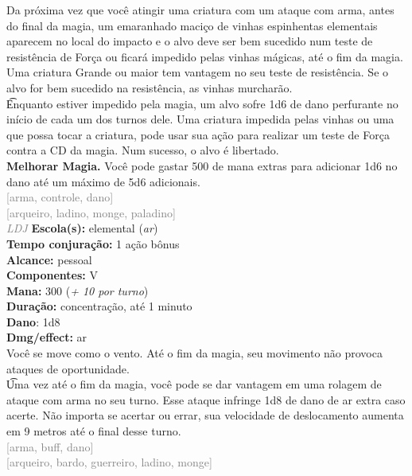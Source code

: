 \documentclass{RPG_Adventure}[2021/10/20]
\begin{document}
{\normalsize Da próxima vez que você atingir uma criatura com um ataque com arma, antes do final da magia, um emaranhado maciço de vinhas espinhentas elementais aparecem no local do impacto e o alvo deve ser bem sucedido num teste de resistência de Força ou ficará impedido pelas vinhas mágicas, até o fim da magia. Uma criatura Grande ou maior tem vantagem no seu teste de resistência. Se o alvo for bem sucedido na resistência, as vinhas murcharão.\\\t Enquanto estiver impedido pela magia, um alvo sofre 1d6 de dano perfurante no início de cada um dos turnos dele. Uma criatura impedida pelas vinhas ou uma que possa tocar a criatura, pode usar sua ação para realizar um teste de Força contra a CD da magia. Num sucesso, o alvo é libertado.\\\t \textbf{Melhorar Magia.} Você pode gastar 500 de mana extras para adicionar 1d6 no dano até um máximo de 5d6 adicionais.\\}
{\scriptsize \textcolor{gray}{[arma, controle, dano]\\}}
{\scriptsize \textcolor{gray}{[arqueiro, ladino, monge, paladino]\\}}
{\tiny \textcolor{gray}{\textit{LDJ}}}
{\small \t \textbf{Escola(s):} elemental (\textit{ar})\\\t \textbf{Tempo conjuração:} 1 ação bônus\\\t \textbf{Alcance:} pessoal\\\t \textbf{Componentes:} V\\\t \textbf{Mana:} 300 (\textit{+ 10 por turno})\\\t \textbf{Duração:} concentração, até 1 minuto\\\t \textbf{Dano}: 1d8\\\t \textbf{Dmg/effect:} ar\\}
{\normalsize Você se move como o vento. Até o fim da magia, seu movimento não provoca ataques de oportunidade.\\\t Uma vez até o fim da magia, você pode se dar vantagem em uma rolagem de ataque com arma no seu turno. Esse ataque infringe 1d8 de dano de ar extra caso acerte. Não importa se acertar ou errar, sua velocidade de deslocamento aumenta em 9 metros até o final desse turno.\\}
{\scriptsize \textcolor{gray}{[arma, buff, dano]\\}}
{\scriptsize \textcolor{gray}{[arqueiro, bardo, guerreiro, ladino, monge]\\}}
\end{document}
